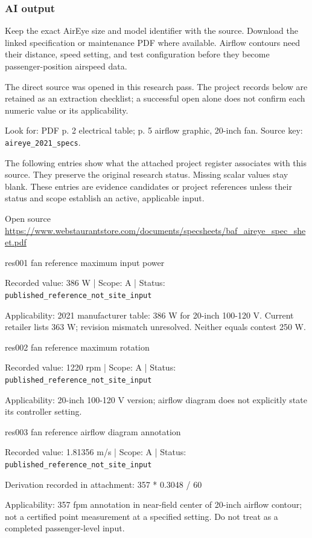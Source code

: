 \subsubsection*{AI output}
Keep the exact AirEye size and model identifier with the source. Download the linked specification or maintenance PDF where available. Airflow contours need their distance, speed setting, and test configuration before they become passenger-position airspeed data.

The direct source was opened in this research pass. The project records below are retained as an extraction checklist; a successful open alone does not confirm each numeric value or its applicability.

Look for: PDF p. 2 electrical table; p. 5 airflow graphic, 20-inch fan. Source key: \nolinkurl{aireye_2021_specs}.

The following entries show what the attached project register associates with this source. They preserve the original research status. Missing scalar values stay blank. These entries are evidence candidates or project references unless their status and scope establish an active, applicable input.

Open source  \url{https://www.webstaurantstore.com/documents/specsheets/baf_aireye_spec_sheet.pdf}

res001  fan reference maximum input power

Recorded value: 386 W | Scope: A | Status: \nolinkurl{published_reference_not_site_input}

Applicability: 2021 manufacturer table: 386 W for 20-inch 100-120 V. Current retailer lists 363 W; revision mismatch unresolved. Neither equals contest 250 W.

res002  fan reference maximum rotation

Recorded value: 1220 rpm | Scope: A | Status: \nolinkurl{published_reference_not_site_input}

Applicability: 20-inch 100-120 V version; airflow diagram does not explicitly state its controller setting.

res003  fan reference airflow diagram annotation

Recorded value: 1.81356 m/s | Scope: A | Status: \nolinkurl{published_reference_not_site_input}

Derivation recorded in attachment: 357 * 0.3048 / 60

Applicability: 357 fpm annotation in near-field center of 20-inch airflow contour; not a certified point measurement at a specified setting. Do not treat as a completed passenger-level input.

